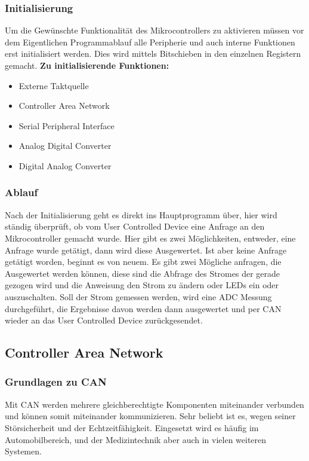 \documentclass[paper=a4, 12pt]{scrreprt}
\begin{document}
		\subsubsection{Initialisierung}
		Um die Gewünschte Funktionalität des Mikrocontrollers zu aktivieren müssen vor dem Eigentlichen Programmablauf alle Peripherie und auch interne Funktionen erst initialisiert werden. Dies wird mittels Bitschieben in den einzelnen Registern gemacht. \hfill \break \hfill \break		
		\textbf{Zu initialisierende Funktionen:}
		\begin{itemize}
			\item Externe Taktquelle
			\item Controller Area Network
			\item Serial Peripheral Interface
			\item Analog Digital Converter
			\item Digital Analog Converter
		\end{itemize}
	
		\subsubsection{Ablauf}
		Nach der Initialisierung geht es direkt ins Hauptprogramm über, hier wird ständig überprüft, ob vom User Controlled Device eine Anfrage an den Mikrocontroller gemacht wurde. Hier gibt es zwei Möglichkeiten, entweder, eine Anfrage wurde getätigt, dann wird diese Ausgewertet. Ist aber keine Anfrage getätigt worden, beginnt es von neuem.\hfill \break
		Es gibt zwei Mögliche anfragen, die Ausgewertet werden können, diese sind die Abfrage des Stromes der gerade gezogen wird und die Anweisung den Strom zu ändern oder LEDs ein oder auszuschalten.\hfill \break
		Soll der Strom gemessen werden, wird eine ADC Messung durchgeführt, die Ergebnisse davon werden dann ausgewertet und per CAN wieder an das User Controlled Device zurückgesendet.\hfill \break
		
	
		\newpage
		
		\subsection{Controller Area Network}
			\subsubsection{Grundlagen zu CAN}
			Mit CAN werden mehrere gleichberechtigte Komponenten miteinander verbunden und können somit miteinander kommunizieren. Sehr beliebt ist es, wegen seiner Störsicherheit und der Echtzeitfähigkeit. Eingesetzt wird es häufig im Automobilbereich, und der Medizintechnik aber auch in vielen weiteren Systemen.
			
\end{document}
